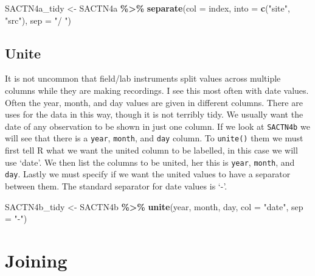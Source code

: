 \documentclass[
]{book}
\newenvironment{Shaded}{\begin{snugshade}}{\end{snugshade}}
\newcommand{\DataTypeTok}[1]{\textcolor[rgb]{0.13,0.29,0.53}{#1}}
\newcommand{\KeywordTok}[1]{\textcolor[rgb]{0.13,0.29,0.53}{\textbf{#1}}}
\newcommand{\NormalTok}[1]{#1}
\newcommand{\OperatorTok}[1]{\textcolor[rgb]{0.81,0.36,0.00}{\textbf{#1}}}
\newcommand{\StringTok}[1]{\textcolor[rgb]{0.31,0.60,0.02}{#1}}
\begin{document}
\begin{Shaded}
\begin{Highlighting}[]
\NormalTok{SACTN4a\_tidy <{-}}\StringTok{ }\NormalTok{SACTN4a }\OperatorTok{\%>\%}\StringTok{ }
\StringTok{  }\KeywordTok{separate}\NormalTok{(}\DataTypeTok{col =}\NormalTok{ index, }\DataTypeTok{into =} \KeywordTok{c}\NormalTok{(}\StringTok{"site"}\NormalTok{, }\StringTok{"src"}\NormalTok{), }\DataTypeTok{sep =} \StringTok{"/ "}\NormalTok{)}
\end{Highlighting}
\end{Shaded}

\hypertarget{unite}{%
\subsection{Unite}\label{unite}}

It is not uncommon that field/lab instruments split values across multiple columns while they are making recordings. I see this most often with date values. Often the year, month, and day values are given in different columns. There are uses for the data in this way, though it is not terribly tidy. We usually want the date of any observation to be shown in just one column. If we look at \texttt{SACTN4b} we will see that there is a \texttt{year}, \texttt{month}, and \texttt{day} column. To \texttt{unite()} them we must first tell R what we want the united column to be labelled, in this case we will use `date'. We then list the columns to be united, her this is \texttt{year}, \texttt{month}, and \texttt{day}. Lastly we must specify if we want the united values to have a separator between them. The standard separator for date values is `-'.

\begin{Shaded}
\begin{Highlighting}[]
\NormalTok{SACTN4b\_tidy <{-}}\StringTok{ }\NormalTok{SACTN4b }\OperatorTok{\%>\%}\StringTok{ }
\StringTok{  }\KeywordTok{unite}\NormalTok{(year, month, day, }\DataTypeTok{col =} \StringTok{"date"}\NormalTok{, }\DataTypeTok{sep =} \StringTok{"{-}"}\NormalTok{)}
\end{Highlighting}
\end{Shaded}

\hypertarget{joining}{%
\section{Joining}\label{joining}}
\end{document}
